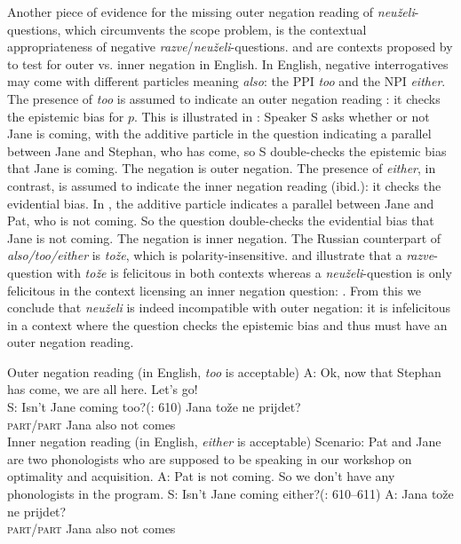 \documentclass[output=paper,colorlinks,citecolor=brown]{langscibook}
\begin{document}
Another piece of evidence for the missing outer negation reading of \textit{neuželi}-questions, which circumvents the scope problem, is the contextual appropriateness of negative \textit{razve}/\textit{neuželi}-questions.  and  are contexts proposed by \citet{romerohan2004negative} to test for outer vs. inner negation in English. In English, negative interrogatives may come with different particles meaning \textit{also}: the PPI \textit{too} and the NPI \textit{either}. The presence of \textit{too} is assumed to indicate an outer negation reading \citep{Ladd1981}: it checks the epistemic bias for $p$. This is illustrated in : Speaker S asks whether or not Jane is coming, with the additive particle in the question indicating a parallel between Jane and Stephan, who has come, so S double-checks the epistemic bias that Jane is coming. The negation is outer negation. The presence of \textit{either}, in contrast, is assumed to indicate the inner negation reading (ibid.): it checks the evidential bias. In , the additive particle indicates a parallel between Jane and Pat, who is not coming. So the question double-checks the evidential bias that Jane is not coming. The negation is inner negation. The Russian counterpart of \textit{also/too/either} is \textit{tože}, which is polarity-insensitive.  and  illustrate that a \textit{razve}-question with \textit{tože} is felicitous in both contexts whereas a \textit{neuželi}-question is only felicitous in the context licensing an inner negation question: . From this we conclude that \textit{neuželi} is indeed incompatible with outer negation: it is infelicitous in a context where the question checks the epistemic bias and thus must have an outer negation reading.

\ea\label{ex:05:12} {Outer negation reading (in English, \textit{too} is acceptable)}
\sn A: Ok, now that Stephan has come, we are all here. Let's go!\\
S: Isn't Jane coming too?\hfill (\citealt{romerohan2004negative}: 610)
\sn
{} Jana tože ne {prijdet?}\\
{\textsc{part}/\textsc{part}} Jana also not {comes}\\
\ex\label{ex:05:13}{Inner negation reading (in English, \textit{either} is acceptable)}
\sn
Scenario: Pat and Jane are two phonologists who are supposed to be speaking in our workshop on optimality and acquisition.
\sn 
A: Pat is not coming. So we don't have any phonologists in the program.
\sn
S: Isn't Jane coming either?\hfill (\citealt{romerohan2004negative}: 610--611)
\sn 
A:  Jana tože ne {prijdet?}\\
{\textsc{part}/\textsc{part}} Jana also not {comes}\\
\z
\end{document}
